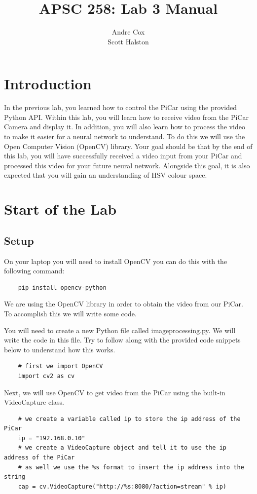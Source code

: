 \documentclass[12pt]{report}
\title{APSC 258: Lab 3 Manual}
\author{Andre Cox \\ Scott Halston}
\begin{document}
\maketitle
\tableofcontents

\clearpage

\chapter{Introduction}
In the previous lab, you learned how to control the PiCar using the provided Python API. Within this lab, you will learn how to receive video from the PiCar Camera and display it. In addition, you will also learn how to process the video to make it easier for a neural network to understand. To do this we will use the Open Computer Vision (OpenCV) library. 
Your goal should be that by the end of this lab, you will have successfully received a video input from your PiCar and processed this video for your future neural network. Alongside this goal, it is also expected that you will gain an understanding of HSV colour space.

\chapter{Start of the Lab}
\section{Setup}
On your laptop you will need to install OpenCV you can do this with the following command:
\begin{verbatim}
    pip install opencv-python  
\end{verbatim}

We are using the OpenCV library in order to obtain the video from our PiCar.  To accomplish this we will write some code.

You will need to create a new Python file called imageprocessing.py. We will write the code in this file.
Try to follow along with the provided code snippets below to understand how this works. 

\begin{verbatim}
    # first we import OpenCV 
    import cv2 as cv 
\end{verbatim}

Next, we will use OpenCV to get video from the PiCar using the built-in VideoCapture class.
\begin{verbatim}
    # we create a variable called ip to store the ip address of the PiCar
    ip = "192.168.0.10"
    # we create a VideoCapture object and tell it to use the ip address of the PiCar
    # as well we use the %s format to insert the ip address into the string
    cap = cv.VideoCapture("http://%s:8080/?action=stream" % ip)
\end{verbatim}
\end{document}
